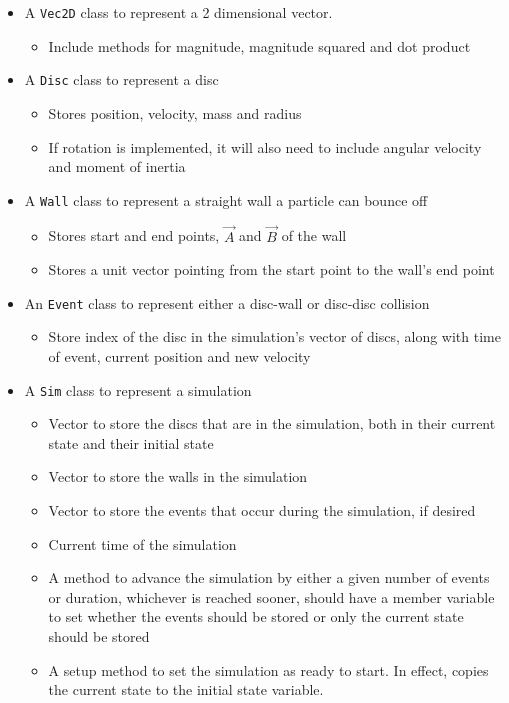 \documentclass{article}
\begin{document}
\begin{itemize}
    \item A \texttt{Vec2D} class to represent a 2 dimensional vector.
    \begin{itemize}
        \item Include methods for magnitude, magnitude squared and dot product
    \end{itemize}
    \item A \texttt{Disc} class to represent a disc
    \begin{itemize}
        \item Stores position, velocity, mass and radius
        \item If rotation is implemented, it will also need to include angular velocity and moment of inertia
    \end{itemize}
    \item A \texttt{Wall} class to represent a straight wall a particle can bounce off
    \begin{itemize}
        \item Stores start and end points, $\vec{A}$ and $\vec{B}$ of the wall
        \item Stores a unit vector pointing from the start point to the wall's end point 
    \end{itemize}
    \item An \texttt{Event} class to represent either a disc-wall or disc-disc collision
    \begin{itemize}
        \item Store index of the disc in the simulation's vector of discs, along with time of event, current position and new velocity
    \end{itemize}
    \item A \texttt{Sim} class to represent a simulation
    \begin{itemize}
        \item Vector to store the discs that are in the simulation, both in their current state and their initial state
        \item Vector to store the walls in the simulation
        \item Vector to store the events that occur during the simulation, if desired
        \item Current time of the simulation
        \item A method to advance the simulation by either a given number of events or duration, whichever is reached sooner, should have a member variable to set whether the events should be stored or only the current state should be stored
        \item A setup method to set the simulation as ready to start. In effect, copies the current state to the initial state variable.
    \end{itemize}
\end{itemize}
\end{document}

